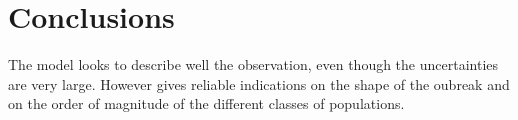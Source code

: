 \section{Conclusions}
\label{sec:conclusions}
The model looks to describe well the observation, even though the uncertainties are very large. However gives reliable indications on the shape of the oubreak and on the order of magnitude of the different classes of populations.